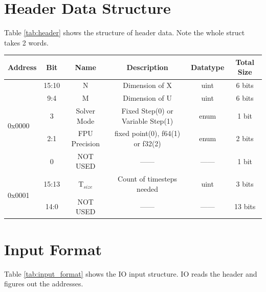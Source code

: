 \documentclass[12pt]{report}
\begin{document}
\section{Header Data Structure}
Table \ref{tab:header} shows the structure of header data. Note the whole struct takes 2 words.
\begin{center}
 \begin{tabular}{||l |c |c| c| c| c||} 
 \hline
 Address & Bit & Name & Description & Datatype & Total Size \\ [0.5ex] 
 \hline\hline
 \multirow{5}{*}{0x0000} & 15:10 & N & Dimension of X  & uint & 6 bits  \\ 
 \cline{2-6}
 & 9:4 & M & Dimension of U  & uint & 6 bits  \\ 
 \cline{2-6}
 & 3 & Solver Mode & Fixed Step(0) or Variable Step(1)  & enum & 1 bit \\ 
 \cline{2-6}
 & 2:1 & FPU Precision & fixed point(0), f64(1) or f32(2) & enum & 2 bits  \\ 
 \cline{2-6}
 & 0  & NOT USED &  ------ & ------ & 1 bit \\
 \hline
 \multirow{2}{*}{0x0001} & 15:13 & T$_{size}$ & Count of timesteps needed & uint & 3 bits \\ 
 \cline{2-6}
 & 14:0 & NOT USED &  ------ & ------ & 13 bits \\
 \hline
\end{tabular}
\end{center}

\section{Input Format}
Table \ref{tab:input_format} shows the IO input structure. IO reads the header and figures out the addresses.
\end{document}
